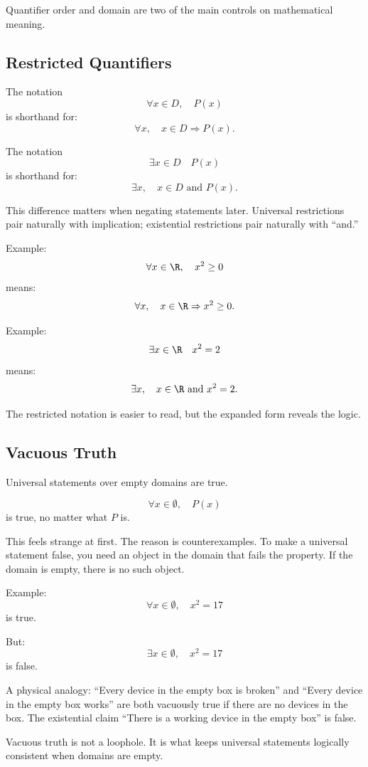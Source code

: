 \begin{focusbox}
Quantifier order and domain are two of the main controls on mathematical meaning.
\end{focusbox}

\subsection{Restricted Quantifiers}

The notation
\[
\forall x\in D,\quad P(x)
\]
is shorthand for:
\[
\forall x,\quad x\in D\Rightarrow P(x).
\]

The notation
\[
\exists x\in D\quad P(x)
\]
is shorthand for:
\[
\exists x,\quad x\in D\text{ and }P(x).
\]

This difference matters when negating statements later. Universal restrictions pair naturally with implication; existential restrictions pair naturally with ``and.''

Example:
\[
\forall x\in\R,\quad x^2\geq0
\]
means:
\[
\forall x,\quad x\in\R\Rightarrow x^2\geq0.
\]

Example:
\[
\exists x\in\R\quad x^2=2
\]
means:
\[
\exists x,\quad x\in\R\text{ and }x^2=2.
\]

The restricted notation is easier to read, but the expanded form reveals the logic.

\subsection{Vacuous Truth}

Universal statements over empty domains are true.

\[
\forall x\in\emptyset,\quad P(x)
\]
is true, no matter what $P$ is.

This feels strange at first. The reason is counterexamples. To make a universal statement false, you need an object in the domain that fails the property. If the domain is empty, there is no such object.

Example:
\[
\forall x\in\emptyset,\quad x^2=17
\]
is true.

But:
\[
\exists x\in\emptyset,\quad x^2=17
\]
is false.

A physical analogy: ``Every device in the empty box is broken'' and ``Every device in the empty box works'' are both vacuously true if there are no devices in the box. The existential claim ``There is a working device in the empty box'' is false.

\begin{trapbox}
Vacuous truth is not a loophole. It is what keeps universal statements logically consistent when domains are empty.
\end{trapbox}

